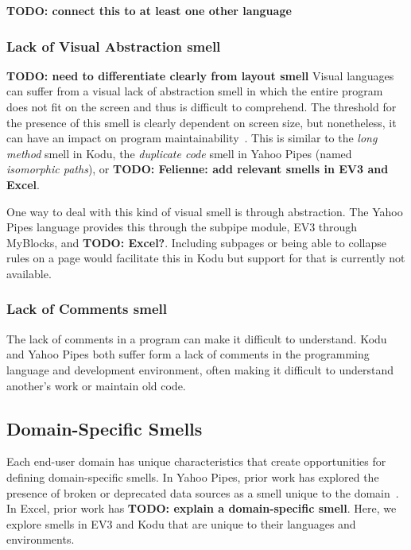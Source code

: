 \documentclass{sig-alternate}
\newcommand{\todo}[1]{\textbf{TODO: #1}}
\begin{document}
\todo{connect this to at least one other language}


	\subsubsection{Lack of Visual Abstraction smell}
	\todo{need to differentiate clearly from layout smell}
	Visual languages can suffer from a visual lack of abstraction smell in which the entire program does not fit on the screen and thus is difficult to comprehend. The threshold for the presence of this smell is clearly dependent on screen size, but nonetheless, it can have an impact on program maintainability~\cite{StoleeTSE2013}. 
	This is similar to the \emph{long method} smell in Kodu, the \emph{duplicate code} smell in Yahoo Pipes (named \emph{isomorphic paths}), or \todo{Felienne: add relevant smells in EV3 and Excel}. 
	
	One way to deal with this kind of visual smell is through abstraction. The  Yahoo Pipes language provides this through the subpipe module, EV3 through MyBlocks, and \todo{Excel?}.  Including subpages or being able to collapse rules on a page would facilitate this in Kodu but support for that is currently not available. 


	\subsubsection{Lack of Comments smell}
	The lack of comments in a program can make it difficult to understand. Kodu and Yahoo Pipes both suffer form a lack of comments
	in the programming language and development environment, often making it difficult to understand another's work or maintain old code. 



\subsection{Domain-Specific Smells}
Each end-user domain has unique characteristics that create opportunities for defining domain-specific smells. In Yahoo Pipes, prior work has explored the presence of broken or deprecated data sources as a smell unique to the domain~\cite{StoleeTSE2013}. In Excel, prior work has \todo{explain a domain-specific smell}. Here, we explore smells in EV3 and Kodu that are unique to their languages and environments. 
\end{document}

